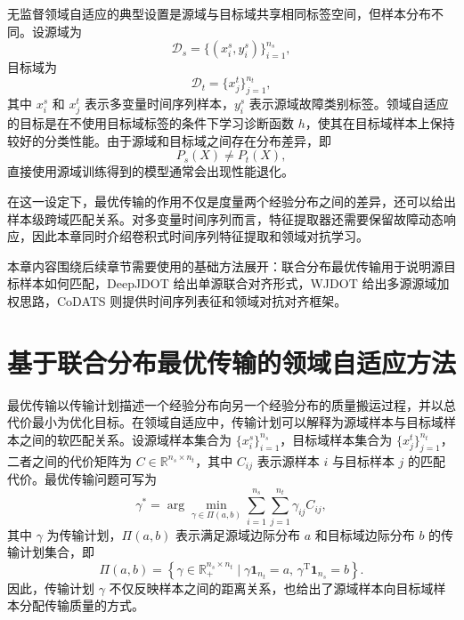 \documentclass{seuthesis-2022}
\begin{document}
无监督领域自适应的典型设置是源域与目标域共享相同标签空间，但样本分布不同。设源域为
\begin{equation}
    \mathcal{D}_s=\{(x_i^s,y_i^s)\}_{i=1}^{n_s},
\end{equation}
目标域为
\begin{equation}
    \mathcal{D}_t=\{x_j^t\}_{j=1}^{n_t},
\end{equation}
其中 $x_i^s$ 和 $x_j^t$ 表示多变量时间序列样本，$y_i^s$ 表示源域故障类别标签。领域自适应的目标是在不使用目标域标签的条件下学习诊断函数 $h$，使其在目标域样本上保持较好的分类性能。由于源域和目标域之间存在分布差异，即
\begin{equation}
    P_s(X) \neq P_t(X),
\end{equation}
直接使用源域训练得到的模型通常会出现性能退化。

在这一设定下，最优传输的作用不仅是度量两个经验分布之间的差异，还可以给出样本级跨域匹配关系\cite{courty2017otda}。对多变量时间序列而言，特征提取器还需要保留故障动态响应，因此本章同时介绍卷积式时间序列特征提取和领域对抗学习\cite{wang2017time,fawaz2019deep}。

本章内容围绕后续章节需要使用的基础方法展开：联合分布最优传输用于说明源目标样本如何匹配，DeepJDOT 给出单源联合对齐形式，WJDOT 给出多源源域加权思路，CoDATS 则提供时间序列表征和领域对抗对齐框架。

\section{基于联合分布最优传输的领域自适应方法}

最优传输以传输计划描述一个经验分布向另一个经验分布的质量搬运过程，并以总代价最小为优化目标。在领域自适应中，传输计划可以解释为源域样本与目标域样本之间的软匹配关系。设源域样本集合为 $\{x_i^s\}_{i=1}^{n_s}$，目标域样本集合为 $\{x_j^t\}_{j=1}^{n_t}$，二者之间的代价矩阵为 $C \in \mathbb{R}^{n_s \times n_t}$，其中 $C_{ij}$ 表示源样本 $i$ 与目标样本 $j$ 的匹配代价。最优传输问题可写为
\begin{equation}
    \gamma^\ast
    =
    \arg\min_{\gamma \in \Pi(a,b)}
    \sum_{i=1}^{n_s}\sum_{j=1}^{n_t}
    \gamma_{ij} C_{ij},
\end{equation}
其中 $\gamma$ 为传输计划，$\Pi(a,b)$ 表示满足源域边际分布 $a$ 和目标域边际分布 $b$ 的传输计划集合，即
\begin{equation}
    \Pi(a,b)
    =
    \left\{
    \gamma \in \mathbb{R}_{+}^{n_s \times n_t}
    \mid
    \gamma \mathbf{1}_{n_t}=a,\,
    \gamma^{\mathrm{T}}\mathbf{1}_{n_s}=b
    \right\}.
\end{equation}
因此，传输计划 $\gamma$ 不仅反映样本之间的距离关系，也给出了源域样本向目标域样本分配传输质量的方式。
\end{document}
